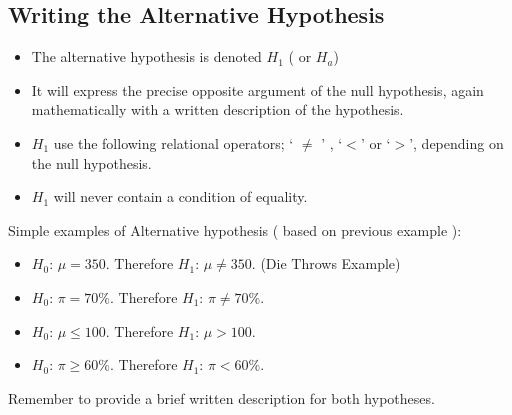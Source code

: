 \documentclass[a4paper,12pt]{article}
\begin{document}
\subsection*{Writing the Alternative Hypothesis}
\begin{itemize}
	\item The alternative hypothesis is denoted $H_1$ ( or $H_a$)
	\item It will express the precise opposite argument of the null hypothesis, again mathematically with a written description of the hypothesis.
	\item $H_1$ use the following relational operators; ` $\neq$ ' , `$<$' or `$>$', depending on the null hypothesis.
	\item $H_1$ will never contain a condition of equality.
\end{itemize}


Simple examples of Alternative hypothesis ( based on previous example ):
\begin{itemize}
	\item $H_0$:  $\mu = 350$.  Therefore  $H_1$:  $\mu \neq 350$. (Die Throws Example)
	\item $H_0$:  $\pi = 70\%$. Therefore  $H_1$:  $\pi \neq 70\%$.
	\item $H_0$:  $\mu \leq 100$. Therefore  $H_1$:  $\mu > 100$.
	\item $H_0$:  $\pi \geq 60\%$. Therefore  $H_1$:  $\pi < 60\%$.
\end{itemize}
Remember to provide a brief written description for both hypotheses.
\end{document}
